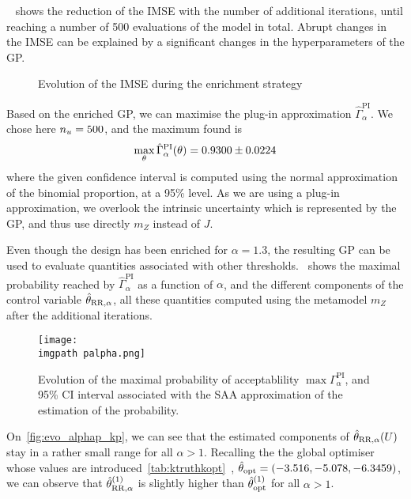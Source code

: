 \documentclass[../../Main_ManuscritThese.tex]{subfiles}
\newcommand\imgpath{/home/victor/acadwriting/Manuscrit/Text/Chapter5/img/}
\begin{document}
~ shows the reduction of the IMSE with the number of
additional iterations, until reaching a number of \num{500}
evaluations of the model in total. Abrupt changes in the IMSE can be
explained by a significant changes in the hyperparameters of the GP.\@

\begin{figure}[ht]
  \centering
  
  \caption{\label{fig:aIMSE} Evolution of the IMSE during the
    enrichment strategy}
\end{figure}


Based on the enriched GP, we can maximise the plug-in approximation
$\hat{\Gamma}_{\alpha}^{\mathrm{PI}}$. We chose here
$n_{u}=\num{500}$, and the maximum found is
\begin{equation}
  \label{eq:max_gamma_alpha}
  \max_{\kk} \hat{\Gamma}_{\alpha}^{\mathrm{PI}}(\kk) = \num[separate-uncertainty=true]{0.93\pm 0.0224}
\end{equation}
where the given confidence interval is computed using the normal
approximation of the binomial proportion, at a \num{95}\% level. As we
are using a plug-in approximation, we overlook the intrinsic
uncertainty which is represented by the GP, and thus use directly
$m_Z$ instead of $J$.

Even though the design has been enriched for $\alpha=1.3$, the
resulting GP can be used to evaluate quantities associated with
other thresholds.~ shows the maximal
probability reached by $\hat{\Gamma}^{\mathrm{PI}}_{\alpha}$ as a
function of $\alpha$, and the different components of the control
variable $\hat{\theta}_{\mathrm{RR},\alpha}$, all these quantities
computed using the metamodel $m_Z$ after the additional iterations.

\begin{figure}[ht]
  \centering
  \texttt{[image: \\imgpath palpha.png]}
  \caption[Evolution of the maximal probability of
    acceptablility $\max \Gamma_{\alpha}^{\mathrm{PI}}$]{\label{fig:p_alpha} Evolution of the maximal probability of
    acceptablility $\max \Gamma_{\alpha}^{\mathrm{PI}}$, and 95\% CI
    interval associated with the SAA approximation of the estimation
    of the probability.}
\end{figure}

On~\cref{fig:evo_alphap_kp}, we can see that the estimated components
of $\hat{\theta}_{\mathrm{RR},\alpha}(U)$ stay in a rather small range
for all $\alpha >1$. Recalling the the global optimiser whose values
are introduced~\cref{tab:ktruthkopt}~,
$\hat{\theta}_{\mathrm{opt}} = (-3.516, -5.078, -6.3459 )$, we can
observe that $\hat{\theta}^{(1)}_{\mathrm{RR}, \alpha}$ is slightly
higher than $\hat{\theta}^{(1)}_{\mathrm{opt}}$ for all $\alpha > 1$.
\end{document}
